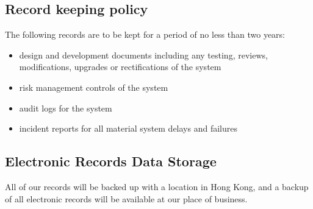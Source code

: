 \subsection{Record keeping policy}
The following records are to be kept for a period of no less than two
years:
\begin{itemize}
  \item design and development documents including  any testing,
    reviews, modifications, upgrades or rectifications of the system
  \item risk management controls of the system
    \item audit logs for the system
    \item incident reports for all material system delays and failures
\end{itemize}

\subsection{Electronic Records Data Storage}
All of our records will be backed up with a location in Hong Kong, and
a backup of all electronic records will be available at our place of business.
